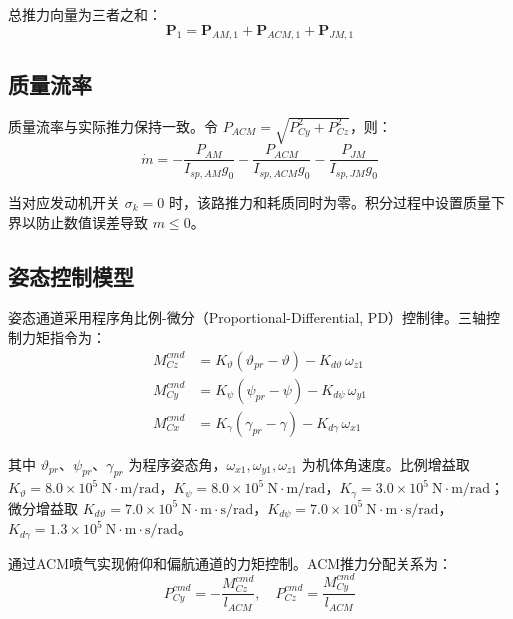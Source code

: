 总推力向量为三者之和：
\begin{equation}
\mathbf P_1=\mathbf P_{AM,1}+\mathbf P_{ACM,1}+\mathbf P_{JM,1} 
\end{equation}

\subsection{质量流率}

质量流率与实际推力保持一致。令 $P_{ACM}=\sqrt{P_{Cy}^2+P_{Cz}^2}$，则：
\begin{equation}
\dot m=-\frac{P_{AM}}{I_{sp,AM}g_0}-\frac{P_{ACM}}{I_{sp,ACM}g_0}-\frac{P_{JM}}{I_{sp,JM}g_0} 
\end{equation}

当对应发动机开关 $\sigma_k=0$ 时，该路推力和耗质同时为零。积分过程中设置质量下界以防止数值误差导致 $m\le0$。

\subsection{姿态控制模型}

姿态通道采用程序角比例-微分（Proportional-Differential, PD）控制律。三轴控制力矩指令为：
\begin{equation}
\begin{aligned}
M_{Cz}^{cmd} &= K_{\vartheta}(\vartheta_{pr}-\vartheta) - K_{d\vartheta}\,\omega_{z1} \\[4pt]
M_{Cy}^{cmd} &= K_{\psi}(\psi_{pr}-\psi) - K_{d\psi}\,\omega_{y1} \\[4pt]
M_{Cx}^{cmd} &= K_{\gamma}(\gamma_{pr}-\gamma) - K_{d\gamma}\,\omega_{x1}
\end{aligned}
\end{equation}

 其中 $\vartheta_{pr}$、$\psi_{pr}$、$\gamma_{pr}$ 为程序姿态角，$\omega_{x1},\omega_{y1},\omega_{z1}$ 为机体角速度。比例增益取 $K_{\vartheta}=8.0\times10^5\ \mathrm{N\cdot m/rad}$，$K_{\psi}=8.0\times10^5\ \mathrm{N\cdot m/rad}$，$K_{\gamma}=3.0\times10^5\ \mathrm{N\cdot m/rad}$；微分增益取 $K_{d\vartheta}=7.0\times10^5\ \mathrm{N\cdot m\cdot s/rad}$，$K_{d\psi}=7.0\times10^5\ \mathrm{N\cdot m\cdot s/rad}$，$K_{d\gamma}=1.3\times10^5\ \mathrm{N\cdot m\cdot s/rad}$。

通过ACM喷气实现俯仰和偏航通道的力矩控制。ACM推力分配关系为：
\begin{equation}
P_{Cy}^{cmd}=-\frac{M_{Cz}^{cmd}}{l_{ACM}},\quad
P_{Cz}^{cmd}=\frac{M_{Cy}^{cmd}}{l_{ACM}} 
\end{equation}

